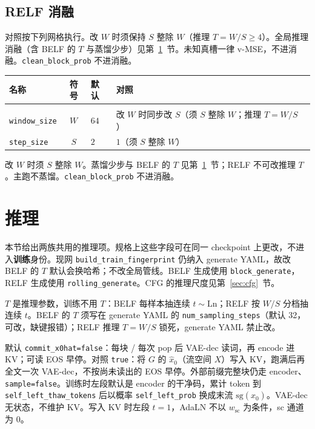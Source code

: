 \documentclass[UTF8,a4paper,11pt]{ctexart}
\begin{document}
\subsection{RELF 消融}

对照按下列网格执行。改 \(W\) 时须保持 \(S\) 整除 \(W\)（推理 \(T=W/S\ge 4\)）。全局推理消融（含 BELF 的 \(T\) 与蒸馏少步）见第~\ref{sec:infer}~节。未知真槽一律 v-MSE，不进消融。\texttt{clean\_block\_prob} 不进消融。

{\small
\setlength{\tabcolsep}{4pt}
\begin{center}
\begin{tabularx}{\textwidth}{@{}
  >{\raggedright\arraybackslash}p{}
  c
  >{\raggedright\arraybackslash}p{}
  >{\raggedright\arraybackslash}X
  @{}}
\toprule
名称 & 符号 & 默认 & 对照 \\
\midrule
\multicolumn{4}{@{}l}{\textit{模型}} \\
\texttt{window\_size} & \(W\) & \(64\) & 改 \(W\) 时同步改 \(S\)（须 \(S\) 整除 \(W\)；推理 \(T=W/S\)） \\
\texttt{step\_size} & \(S\) & \(2\) & \(1\)（须 \(S\) 整除 \(W\)） \\
\bottomrule
\end{tabularx}
\end{center}
}

改 \(W\) 时须 \(S\) 整除 \(W\)。蒸馏少步与 BELF 的 \(T\) 见第~\ref{sec:infer}~节；RELF 不可改推理 \(T\)。主跑不蒸馏。\texttt{clean\_block\_prob} 不进消融。

\section{推理}
\label{sec:infer}

本节给出两族共用的推理项。规格上这些字段可在同一 checkpoint 上更改，不进入\textbf{训练}身份。现网 \texttt{build\_train\_fingerprint} 仍纳入 generate YAML，故改 BELF 的 \(T\) 默认会换哈希；不改全局管线。BELF 生成使用 \texttt{block\_generate}，RELF 生成使用 \texttt{rolling\_generate}。CFG 的推理尺度见第~\ref{sec:cfg}~节。

\(T\) 是推理参数，训练不用 \(T\)：BELF 每样本抽连续 \(t\sim\mathrm{Ln}\)；RELF 按 \(W/S\) 分档抽连续 \(t\)。BELF 的 \(T\) 须写在 generate YAML 的 \texttt{num\_sampling\_steps}（默认 32，可改，缺键报错）；RELF 推理 \(T=W/S\) 锁死，generate YAML 禁止改。

默认 \texttt{commit\_x0hat=false}：每块 / 每次 pop 后 VAE-dec 读词，再 encode 进 KV；可读 EOS 早停。对照 \texttt{true}：将 \(G\) 的 \(\hat x_0\)（流空间 \(X\)）写入 KV，跑满后再全文一次 VAE-dec，不按尚未读出的 EOS 早停。外部前缀完整块仍走 encoder、\texttt{sample=false}。训练时左段默认是 encoder 的干净码，累计 token 到 \texttt{self\_left\_thaw\_tokens} 后以概率 \texttt{self\_left\_prob} 换成末流 \(\mathrm{sg}(\hat x_0)\)。VAE-dec 无状态，不维护 KV。写入 KV 时左段 \(t=1\)，AdaLN 不以 \(w_{\mathrm{sc}}\) 为条件，sc 通道为 0。
\end{document}
